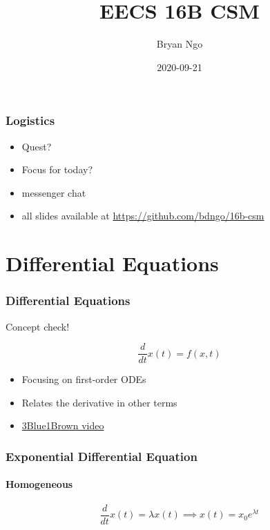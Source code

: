 \documentclass[aspectratio=169]{beamer}
\title{EECS 16B CSM}
\author{Bryan Ngo}
\date{2020-09-21}
\institute{Computer Science Mentors}
\newcommand{\diff}[1]{\frac{d}{d #1}}
\begin{document}
\begin{frame}
    \maketitle
\end{frame}

\begin{frame}
    \tableofcontents
\end{frame}

\begin{frame}
    \frametitle{Logistics}

    \begin{itemize}
        \item Quest?
        \item Focus for today?
        \item messenger chat
        \item all slides available at \url{https://github.com/bdngo/16b-csm}
    \end{itemize}
\end{frame}

\section{Differential Equations}

\begin{frame}
    \frametitle{Differential Equations}

    Concept check! \pause

    \begin{equation}
        \diff{t} x(t) = f(x, t)
    \end{equation}
    \begin{itemize}
        \item Focusing on first-order ODEs
        \item Relates the derivative in other terms
        \item \href{https://youtu.be/p_di4Zn4wz4?list=PLZHQObOWTQDNPOjrT6KVlfJuKtYTftqH6}{3Blue1Brown video}
    \end{itemize}
\end{frame}

\begin{frame}
    \frametitle{Exponential Differential Equation}
    \framesubtitle{Homogeneous}

    \begin{equation}
        \diff{t} x(t) = \lambda x(t) \implies x(t) = x_0 e^{\lambda t}
    \end{equation}
\end{frame}
\end{document}
